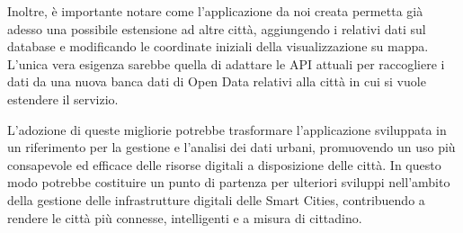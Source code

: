 Inoltre, è importante notare come l'applicazione da noi creata permetta già adesso una possibile estensione ad altre città, aggiungendo i relativi dati sul database e modificando le coordinate iniziali della visualizzazione su mappa. L'unica vera esigenza sarebbe quella di adattare le API attuali per raccogliere i dati da una nuova banca dati di Open Data relativi alla città in cui si vuole estendere il servizio.

L'adozione di queste migliorie potrebbe trasformare l'applicazione sviluppata in un riferimento per la gestione e l'analisi dei dati urbani, promuovendo un uso più consapevole ed efficace delle risorse digitali a disposizione delle città. In questo modo potrebbe costituire un punto di partenza per ulteriori sviluppi nell'ambito della gestione delle infrastrutture digitali delle Smart Cities, contribuendo a rendere le città più connesse, intelligenti e a misura di cittadino.